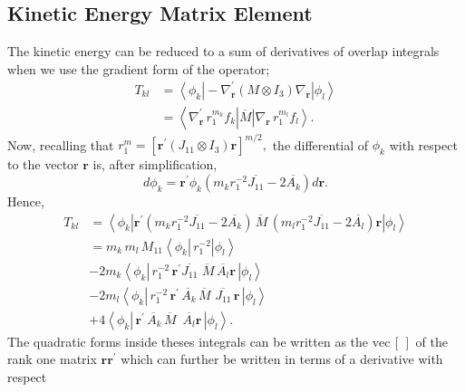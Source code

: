 \documentclass[12pt]{article}
\begin{document}
\subsection{Kinetic Energy Matrix Element}

The kinetic energy can be reduced to a sum of derivatives of overlap integrals
when we use the gradient form of the operator;
\begin{align}
T_{kl} &  =\left\langle \phi_{k}\right|  -\nabla_{\mathbf{r}}^{\prime}\left(
M\otimes I_{3}\right)  \nabla_{\mathbf{r}}\left|  \phi_{l}\right\rangle \\
&  =\left\langle \nabla_{\mathbf{r}}^{\prime}\,r_{1}^{m_{k}}f_{k}\right|
\overline{M}\left|  \nabla_{\mathbf{r}}\,r_{1}^{m_{l}}f_{l}\right\rangle
.\nonumber
\end{align}
Now, recalling that $r_{1}^{m}=\left[  \mathbf{r}^{\prime}(J_{11}\otimes
I_{3})\mathbf{r}\right]  ^{m/2},$ the differential of $\phi_{k}$ with respect
to the vector $\mathbf{r}$ is, after simplification,
\begin{equation}
d\phi_{k}=\mathbf{r}^{\prime}\phi_{k}\left(  m_{k}r_{1}^{-2}\overline{J_{11}%
}-2\overline{A_{k}}\right)  d\mathbf{r.}%
\end{equation}
Hence,
\begin{align}
T_{kl} &  =\left\langle \phi_{k}\right|  \mathbf{r}^{\prime}\left(  m_{k}%
r_{1}^{-2}\overline{J_{11}}-2\overline{A_{k}}\right)  \overline{\,M}\,\left(
m_{l}r_{1}^{-2}\overline{J_{11}}-2\overline{A_{l}}\right)  \mathbf{r}\left|
\phi_{l}\right\rangle \\
&  =m_{k}\,m_{l}\,M_{11}\left\langle \phi_{k}\right|  \,r_{1}^{-2}\left|
\phi_{l}\right\rangle \nonumber\\
&  -2m_{k}\left\langle \phi_{k}\right|  \,r_{1}^{-2}\,\mathbf{r}^{\prime
}\overline{J_{11}}\,\overline{\,M}\,\overline{A_{l}}\mathbf{r\,}\left|
\phi_{l}\right\rangle \nonumber\\
&  -2m_{l}\left\langle \phi_{k}\right|  \,r_{1}^{-2}\,\mathbf{r}^{\prime
}\overline{\,A_{k}}\,\overline{M}\,\,\overline{J_{11}}\,\mathbf{r\,}\left|
\phi_{l}\right\rangle \nonumber\\
&  +4\left\langle \phi_{k}\right|  \,\mathbf{r}^{\prime}\overline{\,A_{k}%
}\,\overline{M}\,\,\,\overline{A_{l}}\mathbf{r\,}\left|  \phi_{l}\right\rangle
.\nonumber
\end{align}
The quadratic forms inside theses integrals can be written as the
$\mathrm{vec}\,\left[  \,\right]  $ of the rank one matrix $\mathbf{rr}%
^{\prime}$ which can further be written in terms of a derivative with respect
\end{document}
